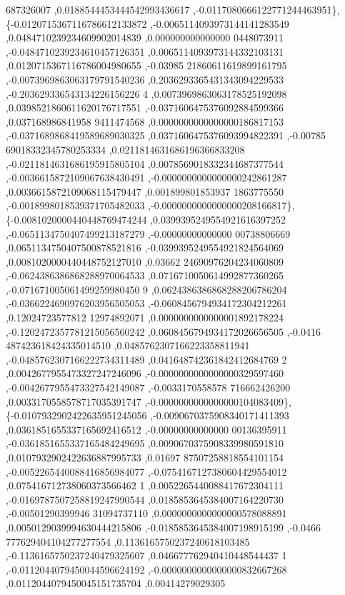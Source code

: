 \begin{DoxyCode}
      687326007 ,0.0188544453444542993436617 ,-0.0117080666122771244463951\},
\{-0.0120715367116786612133872 ,-0.0065114093973144141283549 ,0.0484710239234609902014839 ,0.000000000000000
      0448073911 ,-0.0484710239234610457126351 ,0.0065114093973144332103131 ,0.0120715367116786004980655 ,-0.03985
      21860611619899161795 ,-0.0073969863063179791540236 ,0.2036293365431343094229533 ,-0.203629336543134226156226
      4 ,0.0073969863063178525192098 ,0.0398521860611620176717551 ,-0.0371606475376092884599366 ,0.037168986841958
      9411474568 ,0.0000000000000000186817153 ,-0.0371689868419589689030325 ,0.0371606475376093994822391 ,-0.00785
      69018332345780253334 ,0.0211814631686196366833208 ,-0.0211814631686195915805104 ,0.0078569018332344687377544
       ,-0.0036615872109067638430491 ,-0.0000000000000000242861287 ,0.0036615872109068115479447 ,0.001899801853937
      1863775550 ,-0.0018998018539371705482033 ,-0.0000000000000000208166817\},
\{-0.0081020000440448769474244 ,0.0399395249554921616397252 ,-0.0651134750407499213187279 ,-0.00000000000000
      00738806669 ,0.0651134750407500878521816 ,-0.0399395249554921824564069 ,0.0081020000440448752127010 ,0.03662
      24690976204234060809 ,-0.0624386386868288970064533 ,0.0716710050614992877360265 ,-0.071671005061499259980450
      9 ,0.0624386386868288206786204 ,-0.0366224690976203956505053 ,-0.0608456794934172304212261 ,0.12024723577812
      12974892071 ,0.0000000000000001892178224 ,-0.1202472357781215056560242 ,0.0608456794934172026656505 ,-0.0416
      487423618424335014510 ,0.0485762307166223358811941 ,-0.0485762307166222734311489 ,0.041648742361842412684769
      2 ,0.0042677955473327247246096 ,-0.0000000000000000329597460 ,-0.0042677955473327542149087 ,-0.0033170558578
      716662426200 ,0.0033170558578717035391747 ,-0.0000000000000000104083409\},
\{-0.0107932902422635951245056 ,-0.0090670375908340171411393 ,0.0361851655337165692416512 ,-0.00000000000000
      00136395911 ,-0.0361851655337165484249695 ,0.0090670375908339980591810 ,0.0107932902422636887995733 ,0.01697
      87507258818554101154 ,-0.0052265440088416856984077 ,-0.0754167127380604429554012 ,0.075416712738060373566462
      1 ,0.0052265440088417672304111 ,-0.0169787507258819247990544 ,0.0185853645384007164220730 ,-0.00501290399946
      31094737110 ,0.0000000000000000578088891 ,0.0050129039994630444215806 ,-0.0185853645384007198915199 ,-0.0466
      777629404104277277554 ,0.1136165750237240618103485 ,-0.1136165750237240479325607 ,0.046677762940410448544437
      1 ,-0.0112044079450044596624192 ,-0.0000000000000000832667268 ,0.0112044079450045151735704 ,0.00414279029305

\end{DoxyCode}
